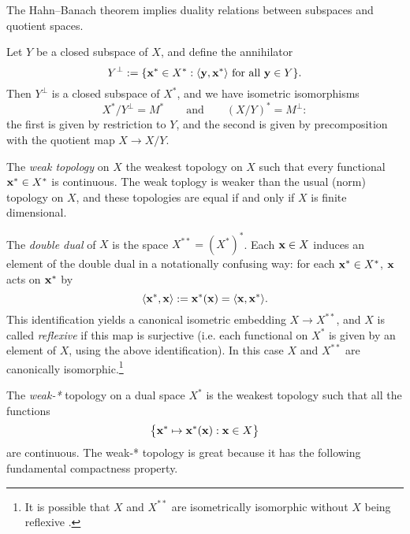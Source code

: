 The Hahn--Banach theorem implies duality relations between subspaces and quotient spaces.

\begin{prop}\label{prop:duality-subspace-quotient}
  Let $Y$ be a closed subspace of $X$, and define the annihilator
  \begin{equation*}
    Y^\perp := \{\mathbf{x}^* \in X^* : \text{$\langle \mathbf{y}, \mathbf{x}^* \rangle$ for all $\mathbf{y} \in Y$}\}. 
  \end{equation*}
  Then $Y^{\perp}$ is a closed subspace of $X^*$, and we have isometric isomorphisms
  \begin{equation*}
    X^* / Y^\perp = M^* \qquad \text{and} \qquad (X/Y)^* = M^{\perp}:
  \end{equation*}
  the first is given by restriction to $Y$, and the second is given by precomposition with the quotient map $X \to X / Y$.
\end{prop}



The \emph{weak topology} on $X$ the weakest topology on $X$ such that every functional $\mathbf{x}^* \in X^*$ is continuous.
The weak toplogy is weaker than the usual (norm) topology on $X$, and these topologies are equal if and only if $X$ is finite dimensional.

The \emph{double dual} of $X$ is the space $X^{**} = (X^*)^*$.
Each $\mathbf{x} \in X$ induces an element of the double dual in a notationally confusing way: for each $\mathbf{x}^* \in X^*$, $\mathbf{x}$ acts on $\mathbf{x}^*$ by
\begin{equation*}
  \langle \mathbf{x}^*, \mathbf{x} \rangle := \mathbf{x}^*(\mathbf{x}) = \langle \mathbf{x}, \mathbf{x}^* \rangle.
\end{equation*}
This identification yields a canonical isometric embedding $X \to X^{**}$, and $X$ is called \emph{reflexive} if this map is surjective (i.e. each functional on $X^*$ is given by an element of $X$, using the above identification).
In this case $X$ and $X^{**}$ are canonically isomorphic.\footnote{It is possible that $X$ and $X^{**}$ are isometrically isomorphic without $X$ being reflexive \cite{rJ51}.}

The \emph{weak-*} topology on a dual space $X^*$ is the weakest topology such that all the functions
\begin{equation*}
  \big\{ \mathbf{x}^* \mapsto \mathbf{x}^*(\mathbf{x}) : \mathbf{x} \in X\big\}
\end{equation*}
are continuous.
The weak-* topology is great because it has the following fundamental compactness property.

